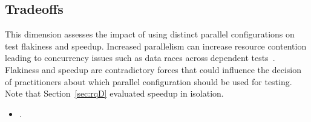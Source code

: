\subsection{Tradeoffs}
\label{sec:rq6-tradeoffs}


This dimension assesses the impact of using distinct parallel
configurations on test flakiness and speedup.  Increased parallelism
can increase resource contention leading to concurrency issues such as
data races across dependent
tests~\cite{luo-etal-fse2014,bell-etal-esecfse2015}.  Flakiness and
speedup are contradictory forces that could influence the decision of
practitioners about which parallel configuration should be used for
testing.  Note that Section~\ref{sec:rqD} evaluated speedup in
isolation.

\begin{itemize}
  \item \numRQIssuesOne{}. \textbf{\RQIssuesOne{}}
\end{itemize}




